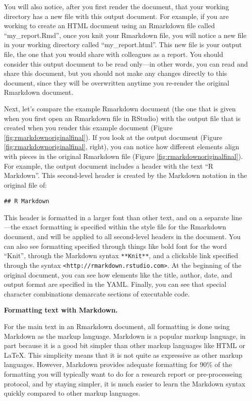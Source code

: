 \documentclass[]{tufte-book}
\begin{document}
You will also notice, after you first render the document, that your working
directory has a new file with this output document. For example, if you are
working to create an HTML document using an Rmarkdown file called
``my\_report.Rmd'', once you knit your Rmarkdown file, you will notice a new file
in your working directory called ``my\_report.html''. This new file is your output
file, the one that you would share with colleagues as a report. You should
consider this output document to be read only---in other words, you can read and
share this document, but you should not make any changes directly to this
document, since they will be overwritten anytime you re-render the original
Rmarkdown document.

Next, let's compare the example Rmarkdown document (the one that is given when
you first open an Rmarkdown file in RStudio) with the output file that is
created when you render this example document (Figure
\ref{fig:rmarkdownoriginalfinal}). If you look at the output document (Figure
\ref{fig:rmarkdownoriginalfinal}, right), you can notice how different elements
align with pieces in the original Rmarkdown file (Figure
\ref{fig:rmarkdownoriginalfinal}). For example, the output document includes a
header with the text ``R Markdown''. This second-level header is created by the
Markdown notation in the original file of:

\begin{verbatim}
## R Markdown
\end{verbatim}

This header is formatted in a larger font than other text, and on a separate
line---the exact formatting is specified within the style file for the Rmarkdown
document, and will be applied to all second-level headers in the document. You
can also see formatting specified through things like bold font for the word
``Knit'', through the Markdown syntax \texttt{**Knit**}, and a clickable link specified
through the syntax \texttt{\textless{}http://rmarkdown.rstudio.com\textgreater{}}. At the beginning of the
original document, you can see how elements like the title, author, date, and
output format are specified in the YAML. Finally, you can see that special
character combinations demarcate sections of executable code.

\textbf{Formatting text with Markdown.}

For the main text in an Rmarkdown document, all formatting is done using
Markdown as the markup language. Markdown is a popular markup language, in part
because it is a good bit simpler than other markup languages like HTML or LaTeX.
This simplicity means that it is not quite as expressive as other markup
languages. However, Markdown provides adequate formatting for 90\% of the
formatting you will typically want to do for a research report or
pre-processeing protocol, and by staying simpler, it is much easier to learn the
Markdown syntax quickly compared to other markup languages.
\end{document}

